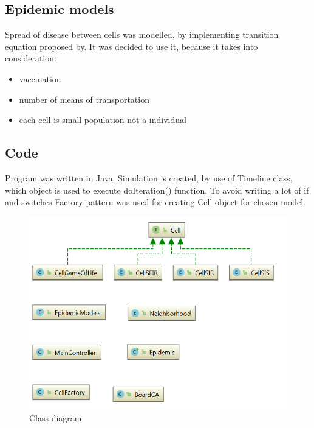 \documentclass[a4paper, 11pt]{article}
\begin{document}
\subsection{Epidemic models}
Spread of disease between cells was modelled, by implementing transition equation proposed by\cite{WHITE}. It was decided to use it, because it takes into consideration:\\
\begin{itemize}
\item vaccination
\item number of means of transportation
\item each cell is small population not a individual
\end{itemize}

\subsection{Code}
Program was written in Java. Simulation is created, by use of Timeline class, which object is used to execute doIteration() function. To avoid writing a lot of if and switches Factory pattern was used for creating Cell object for chosen model.
\begin{figure}
\includegraphics[scale=0.7]{klasy.PNG} 
\caption{Class diagram}
\end{figure}



\end{document}
